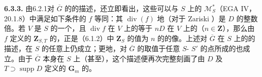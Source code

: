 \textbf{6.3.3.} 由6.2.1对 $\overline G$ 的的描述，还立即看出，这些可以与 $S$ 上的 $\mathcal M_S^*$（EGA IV，20.1.8）中满足如下条件的 $f$ 等同：其 $\operatorname{div}(f)$ 地（对于 Zariski ）是 $D$ 的整数倍。若 $V$ 是 $S$ 的一个，且 $\operatorname{div}f$ 在 $V$ 上的等于 $nD$ 在 $V$ 上的（$n\in\mathbf Z$），那么由 $f$ 定义的 $\mathbf Z_{S,T}$ 的，正是（6.1.2）中 $\mathbf Z_S$ 的值为 $n$ 的的像。上述对 $\overline G$ 在 $S$ 上的的描述，在 $S$ 的任意上仍成立；更地，对 $\overline G$ 的取值于任意 $S$- $S'$ 的点所成的也成立。由于 $\overline G$ 本身在 $S$ 上（甚至），这个描述便再次完整刻画了由 $D$ 及 $T\supset\operatorname{supp}D$ 定义的 $\mathbf G_m$ 的。

